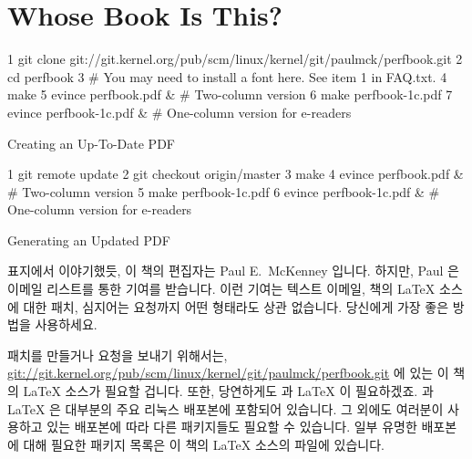 \section{Whose Book Is This?}
\label{sec:howto:Whose Book Is This?}

\begin{listing*}[tbp]
{
\scriptsize
\begin{verbbox}
  1 git clone git://git.kernel.org/pub/scm/linux/kernel/git/paulmck/perfbook.git
  2 cd perfbook
  3 # You may need to install a font here. See item 1 in FAQ.txt.
  4 make
  5 evince perfbook.pdf & # Two-column version
  6 make perfbook-1c.pdf
  7 evince perfbook-1c.pdf & # One-column version for e-readers
\end{verbbox}
}
\hspace*{1in}\OneColumnHSpace{-0.5in}\theverbbox
\caption{Creating an Up-To-Date PDF}
\label{lst:howto:Creating a Up-To-Date PDF}
\end{listing*}

\begin{listing*}[tbp]
{
\scriptsize
\begin{verbbox}
  1 git remote update
  2 git checkout origin/master
  3 make
  4 evince perfbook.pdf & # Two-column version
  5 make perfbook-1c.pdf
  6 evince perfbook-1c.pdf & # One-column version for e-readers
\end{verbbox}
}
\hspace*{1in}\OneColumnHSpace{-0.5in}\theverbbox
\caption{Generating an Updated PDF}
\label{lst:howto:Generating an Updated PDF}
\end{listing*}

표지에서 이야기했듯, 이 책의 편집자는 Paul E.~McKenney 입니다.
하지만, Paul 은  이메일 리스트를 통한 기여를
받습니다.
이런 기여는 텍스트 이메일, 책의 \LaTeX{} 소스에 대한 패치, 심지어는  요청까지 어떤 형태라도 상관 없습니다.
당신에게 가장 좋은 방법을 사용하세요.
\iffalse

As the cover says, the editor is one Paul E.~McKenney.
However, the editor does accept contributions via the
\href{mailto:perfbook@vger.kernel.org}
{\nolinkurl{perfbook@vger.kernel.org}} email list.
These contributions can be in pretty much any form, with popular
approaches including text emails,
patches against the book's \LaTeX{} source, and even \co{git pull} requests.
Use whatever form works best for you.
\fi

패치를 만들거나  요청을 보내기 위해서는,
\url{git://git.kernel.org/pub/scm/linux/kernel/git/paulmck/perfbook.git} 에
있는 이 책의 \LaTeX{} 소스가 필요할 겁니다.
또한, 당연하게도  과 \LaTeX{} 이 필요하겠죠.  과 \LaTeX{} 은
대부분의 주요 리눅스 배포본에 포함되어 있습니다.
그 외에도 여러분이 사용하고 있는 배포본에 따라 다른 패키지들도 필요할 수
있습니다.
일부 유명한 배포본에 대해 필요한 패키지 목록은 이 책의 \LaTeX{} 소스의
 파일에 있습니다.
\iffalse

